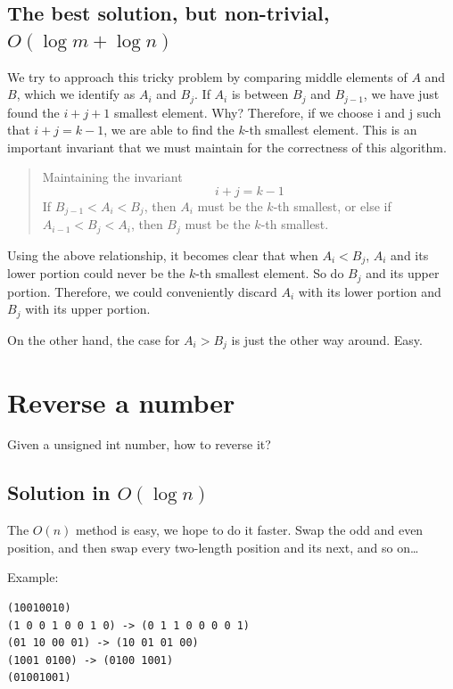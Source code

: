 \documentclass[12pt, reqno, oneside]{amsart}
\begin{document}
\subsection{The best solution, but non-trivial, $O(\log m + \log n)$}

We try to approach this tricky problem by comparing middle elements of $A$ and $B$, which we identify as $A_{i}$ and $B_{j}$. If $A_{i}$ is between $B_{j}$ and $B_{j-1}$, we have just found the $i+j+1$ smallest element. Why? Therefore, if we choose i and j such that $i+j = k-1$, we are able to find the $k$-th smallest element. This is an important invariant that we must maintain for the correctness of this algorithm.

\begin{framed}
\begin{quote}
Maintaining the invariant
$$i + j = k - 1$$
If $B_{j-1} < A_{i} < B_{j}$, then $A_{i}$ must be the $k$-th smallest, \newline
or else if $A_{i-1} < B_{j} < A_{i}$, then $B_{j}$ must be the $k$-th smallest.
\end{quote}
\end{framed}

Using the above relationship, it becomes clear that when $A_{i} < B_{j}$, $A_{i}$ and its lower portion could never be the $k$-th smallest element. So do $B_{j}$ and its upper portion. Therefore, we could conveniently discard $A_{i}$ with its lower portion and $B_{j}$ with its upper portion.

On the other hand, the case for $A_{i} > B_{j}$ is just the other way around. Easy.



\section{Reverse a number}
Given a unsigned int number, how to reverse it?
\subsection{Solution in $O(\log n)$}
The  $O(n)$ method is easy, we hope to do it faster.
Swap the odd and even position, and then swap every two-length position and its next, and so on…

Example:
\begin{verbatim}
(10010010)
(1 0 0 1 0 0 1 0) -> (0 1 1 0 0 0 0 1)
(01 10 00 01) -> (10 01 01 00)
(1001 0100) -> (0100 1001)
(01001001)
\end{verbatim}
\end{document}
